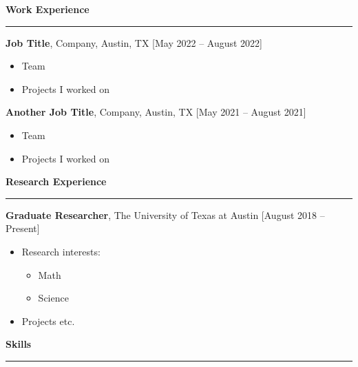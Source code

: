 \documentclass[10pt,letterpaper,hidelinks]{article}
\begin{document}

\vspace{0.1cm}
\begin{flushleft}
\large{\textbf{Work Experience}}
\vspace{0.1cm}
\hrule
\end{flushleft}

\textbf{Job Title}, Company, Austin, TX \hfill [May 2022 -- August 2022]
\vspace{-0.1cm}
\begin{itemize}
	\setlength\itemsep{-0.1cm}
    \item Team
    \item Projects I worked on
\end{itemize}

\textbf{Another Job Title}, Company, Austin, TX \hfill [May 2021 -- August 2021]
\vspace{-0.1cm}
\begin{itemize}
	\setlength\itemsep{-0.1cm}
    \item Team
    \item Projects I worked on
\end{itemize}



\vspace{0.1cm}
\begin{flushleft}
\large{\textbf{Research Experience}}
\vspace{0.1cm}
\hrule
\end{flushleft}

\textbf{Graduate Researcher}, The University of Texas at Austin \hfill [August 2018 -- Present]
\vspace{-0.1cm}
\begin{itemize}
	\setlength\itemsep{-0.1cm}
    \item Research interests:
    \begin{itemize}
        \item Math
        \item Science
    \end{itemize}
    \item Projects etc.
\end{itemize}



\vspace{0.1cm}
\begin{flushleft}
\large{\textbf{Skills}}
\vspace{0.1cm}
\hrule
\end{flushleft}
\end{document}
